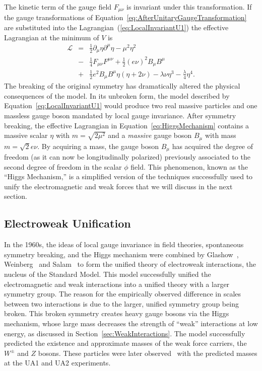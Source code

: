The kinetic term of the gauge field $F_{\mu\nu}$ is invariant under this
transformation.  If the gauge transformations of
Equation~\ref{eq:AfterUnitaryGaugeTransformation} are substituted into the
Lagrangian~(\ref{eq:LocalInvariantU1}) the effective Lagrangian at the minimum
of $V$ is
\begin{eqnarray}
  \mathcal{L} &=& \frac{1}{2} \partial_\mu \eta \partial^\mu \eta -
  \mu^2 \eta^2  \nonumber \\
  &-& \frac{1}{4} F_{\mu\nu} F^{\mu\nu} + \frac{1}{2} (e\nu)^2 B_\mu B^\mu
  \nonumber \\
  &+& \frac{1}{2} e^2 B_\mu B^\mu \eta (\eta + 2 \nu) - \lambda \nu \eta^3 -
  \frac{\lambda }{4}\eta^4.
  \label{eq:HiggsMechanism}
\end{eqnarray}
The breaking of the original symmetry has dramatically altered the physical
consequences of the model.  In its unbroken form, the model described by
Equation~\ref{eq:LocalInvariantU1} would produce two real massive particles and
one massless gauge boson mandated by local gauge invariance.  After symmetry
breaking, the effective Lagrangian in Equation~\ref{eq:HiggsMechanism} contains
a massive scalar $\eta$ with $m = \sqrt{2\mu^2}$ and a \emph{massive} gauge
boson $B_\mu$ with mass $m = \sqrt 2 e\nu$.  By acquiring a mass, the gauge
boson $B_\mu$ has acquired the degree of freedom (as it can now be
longitudinally polarized) previously associated to the second degree of freedom
in the scalar $\phi$ field.  This phenomenon, known as the ``Higgs Mechanism,''
is a simplified version of the techniques successfully used to unify the
electromagnetic and weak forces that we will discuss in the next section.  

\subsection{Electroweak Unification}
\label{sec:ElectroweakUnification} In the 1960s, the ideas of local gauge
invariance in field theories, spontaneous symmetry breaking, and the Higgs
mechanism were combined by Glashow~\cite{Glashow:1961tr},
Weinberg~\cite{Weinberg:1967tq} and Salam~\cite{Salam:1968rm} to form the
unified theory of electroweak interactions, the nucleus of the Standard Model.
This model successfully unified the electromagnetic and weak interactions into a
unified theory with a larger symmetry group.  The reason for the empirically
observed difference in scales between two interactions is due to the larger,
unified symmetry group being broken.  This broken symmetry creates heavy gauge
bosons via the Higgs mechanism, whose large mass decreases the strength of
``weak'' interactions at low energy, as discussed in
Section~\ref{sec:WeakInteractions}.  The model successfully predicted the
existence and approximate masses of the weak force carriers, the $W^\pm$ and $Z$
bosons.  These particles were later
observed~\cite{UA1WDiscovery,UA2WDiscovery,UA1ZDiscovery,UA2ZDiscovery} with the
predicted masses at the UA1 and UA2 experiments. 

